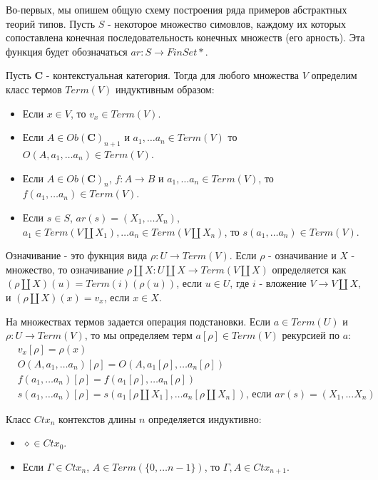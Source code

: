 \documentclass{amsart}
\theoremstyle{definition}
\theoremstyle{remark}
\newcommand{\cat}[1]{\mathbf{#1}}
\renewcommand{\C}{\cat{C}}
\numberwithin{figure}{section}
\begin{document}
Во-первых, мы опишем общую схему построения ряда примеров абстрактных теорий типов.
Пусть $S$ - некоторое множество симовлов, каждому их которых сопоставлена конечная последовательность конечных множеств (его арность).
Эта функция будет обозначаться $ar : S \to FinSet*$.

Пусть $\C$ - контекстуальная категория.
Тогда для любого множества $V$ определим класс термов $Term(V)$ индуктивным образом:
\begin{itemize}
\item Если $x \in V$, то $v_x \in Term(V)$.
\item Если $A \in Ob(\C)_{n + 1}$ и $a_1, \ldots a_n \in Term(V)$ то $O(A, a_1, \ldots a_n) \in Term(V)$.
\item Если $A \in Ob(\C)_n$, $f : A \to B$ и $a_1, \ldots a_n \in Term(V)$, то $f(a_1, \ldots a_n) \in Term(V)$.
\item Если $s \in S$, $ar(s) = (X_1, \ldots X_n)$, $a_1 \in Term(V \amalg X_1), \ldots a_n \in Term(V \amalg X_n)$, то $s(a_1, \ldots a_n) \in Term(V)$.
\end{itemize}

Означивание - это фукнция вида $\rho : U \to Term(V)$.
Если $\rho$ - означивание и $X$ - множество, то означивание $\rho \amalg X : U \amalg X \to Term(V \amalg X)$ определяется как $(\rho \amalg X)(u) = Term(i)(\rho(u))$, если $u \in U$, где $i$ - вложение $V \to V \amalg X$, и $(\rho \amalg X)(x) = v_x$, если $x \in X$.

На множествах термов задается операция подстановки.
Если $a \in Term(U)$ и $\rho : U \to Term(V)$, то мы определяем терм $a[\rho] \in Term(V)$ рекурсией по $a$:
\begin{align*}
& v_x[\rho] = \rho(x) \\
& O(A, a_1, \ldots a_n)[\rho] = O(A, a_1[\rho], \ldots a_n[\rho]) \\
& f(a_1, \ldots a_n)[\rho] = f(a_1[\rho], \ldots a_n[\rho]) \\
& s(a_1, \ldots a_n)[\rho] = s(a_1[\rho \amalg X_1], \ldots a_n[\rho \amalg X_n]) \text{, если } ar(s) = (X_1, \ldots X_n)
\end{align*}

Класс $Ctx_n$ контекстов длины $n$ определяется индуктивно:
\begin{itemize}
\item $\diamond \in Ctx_0$.
\item Если $\Gamma \in Ctx_n$, $A \in Term(\{ 0, \ldots n - 1 \})$, то $\Gamma, A \in Ctx_{n + 1}$.
\end{itemize}
\end{document}
